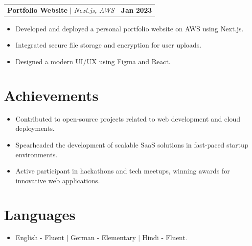 \documentclass[letterpaper,11pt]{article}
\makeatletter
\newcommand{\resumeProjectHeading}[2]{
    \item
    \begin{tabular*}{1.001\textwidth}{l@{\extracolsep{\fill}}r}
      \small#1 & \textbf{\small #2}\\
    \end{tabular*}\vspace{-7pt}
}
\makeatother
\begin{document}
\resumeProjectHeading
{\textbf{Portfolio Website} $|$ \emph{Next.js, AWS}}{Jan 2023}
\vspace{4pt}
\begin{itemize}
\item Developed and deployed a personal portfolio website on AWS using Next.js.
\item Integrated secure file storage and encryption for user uploads.
\item Designed a modern UI/UX using Figma and React.
\end{itemize}

\section{Achievements}
\begin{itemize}
\item Contributed to open-source projects related to web development and cloud deployments.
\item Spearheaded the development of scalable SaaS solutions in fast-paced startup environments.
\item Active participant in hackathons and tech meetups, winning awards for innovative web applications.
\end{itemize}

\section*{Languages}
\begin{itemize}
  \item English - Fluent $|$ German - Elementary $|$ Hindi - Fluent.
\end{itemize}
\end{document}
